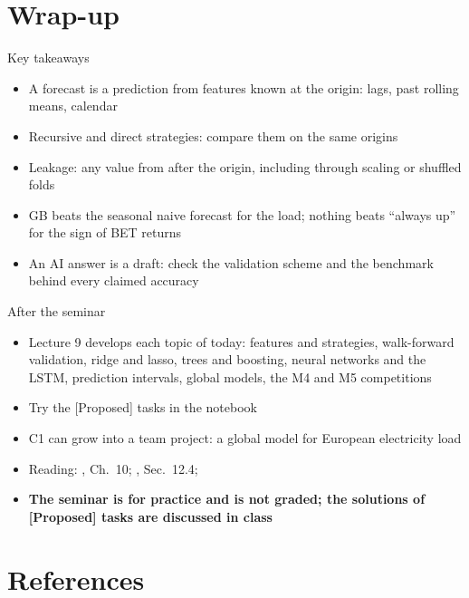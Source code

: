 \section{Wrap-up}

\begin{frame}{Key takeaways}
\itemsize{\small}
\begin{itemize}
    \item A forecast is a prediction from features known at the origin: lags, past rolling means, calendar
    \item Recursive and direct strategies: compare them on the same origins
    \item Leakage: any value from after the origin, including through scaling or shuffled folds
    \item GB beats the seasonal naive forecast for the load; nothing beats ``always up'' for the sign of BET returns
    \item An AI answer is a draft: check the validation scheme and the benchmark behind every claimed accuracy
\end{itemize}
\end{frame}

\begin{frame}{After the seminar}
\itemsize{\small}
\begin{itemize}
    \item Lecture 9 develops each topic of today: features and strategies, walk-forward validation, ridge and lasso, trees and boosting, neural networks and the LSTM, prediction intervals, global models, the M4 and M5 competitions
    \item Try the [Proposed] tasks in the notebook
    \item C1 can grow into a team project: a global model for European electricity load
    \item Reading: , Ch.~10; , Sec.~12.4; 
    \item \textbf{The seminar is for practice and is not graded; the solutions of [Proposed] tasks are discussed in class}
\end{itemize}
\end{frame}


\section{References}


